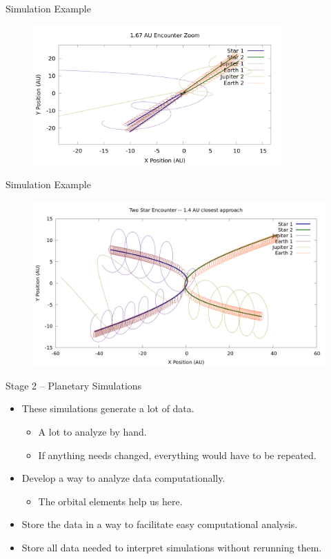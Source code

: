 \documentclass{beamer}
\begin{document}
\begin{frame}{Simulation Example}
    \begin{figure}
        \centering
        \includegraphics[width=3.75in]{1_67_AU_zoom}
    \end{figure}
\end{frame}

\begin{frame}{Simulation Example}
    \begin{figure}
        \centering
        \includegraphics[height=2.5in]{1.4AU/1_4_AU_encounter_plot}
    \end{figure}
\end{frame}

\begin{frame}{Stage 2 -- Planetary Simulations}
    \begin{itemize}
        \item These simulations generate a lot of data.
            \begin{itemize}
                \item A lot to analyze by hand.
                \item If anything needs changed, everything would have to be
                    repeated.
            \end{itemize}
        \item Develop a way to analyze data computationally.
            \begin{itemize}
                \item The orbital elements help us here.
            \end{itemize}
        \item Store the data in a way to facilitate easy computational
            analysis.
        \item Store all data needed to interpret simulations without rerunning them.
    \end{itemize}
\end{frame}
\end{document}
